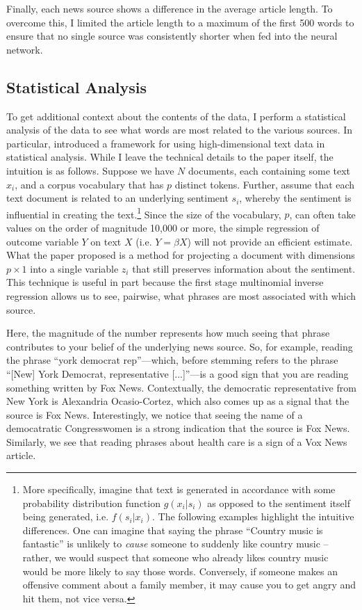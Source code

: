 \documentclass{article}
\begin{document}
	    Finally, each news source shows a difference in the average article length. To overcome this, I limited the article length to a maximum of the first 500 words to ensure that no single source was consistently shorter when fed into the neural network. 
	    
	    \subsection{Statistical Analysis}
	    To get additional context about the contents of the data, I perform a statistical analysis of the data to see what words are most related to the various sources. In particular, \citet{taddy2013multinomial} introduced a framework for using high-dimensional text data in statistical analysis. While I leave the technical details to the paper itself, the intuition is as follows. Suppose we have $N$ documents, each containing some text $x_i$, and a corpus vocabulary that has $p$ distinct tokens. Further, assume that each text document is related to an underlying sentiment $s_i$, whereby the sentiment is influential in creating the text.\footnote{More specifically, imagine that text is generated in accordance with some probability distribution function $g(x_i | s_i)$ as opposed to the sentiment itself being generated, i.e. $f(s_i | x_i)$. The following examples highlight the intuitive differences. One can imagine that saying the phrase ``Country music is fantastic'' is unlikely to \textit{cause} someone to suddenly like country music -- rather, we would suspect that someone who already likes country music would be more likely to say those words. Conversely, if someone makes an offensive comment about a family member, it may cause you to get angry and hit them, not vice versa.} Since the size of the vocabulary, $p$, can often take values on the order of magnitude 10,000 or more, the simple regression of outcome variable $Y$ on text $X$ (i.e. $Y= \beta X$) will not provide an efficient estimate. What the paper proposed is a method for projecting a document with dimensions $p \times 1$ into a single variable $z_i$ that still preserves information about the sentiment. This technique is useful in part because the first stage multinomial inverse regression allows us to see, pairwise, what phrases are most associated with which source. 
	    
	    
	    
	    
		
		Here, the magnitude of the number represents how much seeing that phrase contributes to your belief of the underlying news source. So, for example, reading the phrase ``york democrat rep''---which, before stemming refers to the phrase ``[New] York Democrat, representative [...]''---is a good sign that you are reading something written by Fox News. Contextually, the democratic representative from New York is Alexandria Ocasio-Cortez, which also comes up as a signal that the source is Fox News. Interestingly, we notice that seeing the name of a democatratic Congresswomen is a  strong indication that the source is Fox News. Similarly, we see that reading phrases about health care is a sign of a Vox News article. 
		
\end{document}
